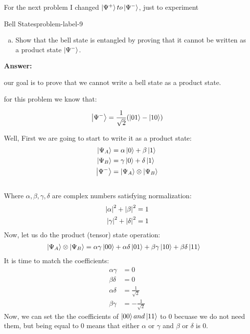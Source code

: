 For the next problem I changed $\ket{\Psi^+} to \ket{\Psi^-} $, just to experiment
\begin{problem}{Bell States}{problem-label-9}
	
	\begin{enumerate}[(a)]
		\item Show that the bell state is entangled by proving that it cannot be written as a product state $\ket{\Psi^-}$.
	\end{enumerate}
	\textbf{Answer:}
	
	our goal is to prove that we cannot  write a bell state as a product state. 
	
	for this problem we know that:
	
	\[
	\ket{\Psi^-} = \frac{1}{\sqrt{2}} (\ket{01}-\ket{10})
	\]
	
	Well, First we are going to start to write it as a product state:\\
		\[
		\begin{aligned}
			\ket{\Psi_A} &= \alpha\ket{0} + \beta\ket{1} \\
			\ket{\Psi_B} &= \gamma\ket{0} + \delta\ket{1} \\
			\ket{\Psi^-} &= \ket{\Psi_A} \otimes \ket{\Psi_B}\\\\
		\end{aligned}
		\]
		Where $\alpha,\beta,\gamma,\delta$ are complex numbers satisfying normalization:
		\[
		\begin{aligned}
		\abs{\alpha}^2 + \abs{\beta}^2 &= 1\\
		\abs{\gamma}^2 + \abs{\delta}^2 &= 1
		\end{aligned}
		\]
		Now, let us do the product (tensor) state operation:
		\[
		\begin{aligned}
			 \ket{\Psi_A} \otimes \ket{\Psi_B} &=   \alpha\gamma\ket{00} + \alpha\delta\ket{01} + \beta\gamma\ket{10} +  \beta\delta\ket{11}
		\end{aligned}
		\]
		It is time to match the coefficients:
		\[
		\begin{aligned}
			 \alpha\gamma &= 0\\
			 \beta\delta &= 0 \\
			 \alpha\delta &= \frac{1}{\sqrt{2}}\\
			 \beta\gamma &= - \frac{1}{\sqrt{2}}
		\end{aligned}
		\]
		Now, we can set the the coefficients of $\ket{00} and \ket{11}$ to 0 becuase we do not need them, but being equal to 0 means that either $ \alpha$ or $\gamma$ and $\beta$ or $\delta$ is 0. \\
		

\end{problem}
